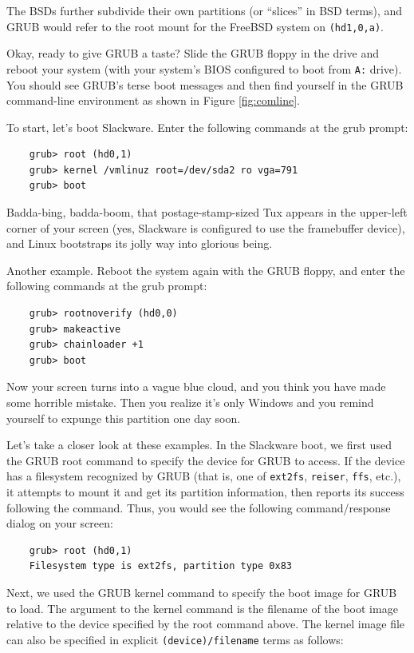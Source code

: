 \documentclass{article}
\begin{document}
The BSDs further subdivide their own partitions (or “slices” in BSD terms), and GRUB would refer to the root mount for the FreeBSD system on \texttt{(hd1,0,a)}.

Okay, ready to give GRUB a taste? Slide the GRUB floppy in the drive and reboot your system (with your system's BIOS configured to boot from \texttt{A:} drive). You should see GRUB's terse boot messages and then find yourself in the GRUB command-line environment as shown in Figure \ref{fig:comline}.

To start, let's boot Slackware. Enter the following commands at the grub prompt:

\begin{verbatim}
    grub> root (hd0,1)
    grub> kernel /vmlinuz root=/dev/sda2 ro vga=791
    grub> boot
\end{verbatim}

Badda-bing, badda-boom, that postage-stamp-sized Tux appears in the upper-left corner of your screen (yes, Slackware is configured to use the framebuffer device), and Linux bootstraps its jolly way into glorious being.

Another example. Reboot the system again with the GRUB floppy, and enter the following commands at the grub prompt:

\begin{verbatim}
    grub> rootnoverify (hd0,0)
    grub> makeactive
    grub> chainloader +1
    grub> boot
\end{verbatim}

Now your screen turns into a vague blue cloud, and you think you have made some horrible mistake. Then you realize it's only Windows and you remind yourself to expunge this partition one day soon.

Let's take a closer look at these examples. In the Slackware boot, we first used the GRUB root command to specify the device for GRUB to access. If the device has a filesystem recognized by GRUB (that is, one of \texttt{ext2fs}, \texttt{reiser}, \texttt{ffs}, etc.), it attempts to mount it and get its partition information, then reports its success following the command. Thus, you would see the following command/response dialog on your screen:

\begin{verbatim}
    grub> root (hd0,1)
    Filesystem type is ext2fs, partition type 0x83
\end{verbatim}

Next, we used the GRUB kernel command to specify the boot image for GRUB to load.
The argument to the kernel command is the filename of the boot image
relative to the device specified by the root command above.
The kernel image file can also be specified in explicit \texttt{(device)/filename} terms as follows:
\end{document}
